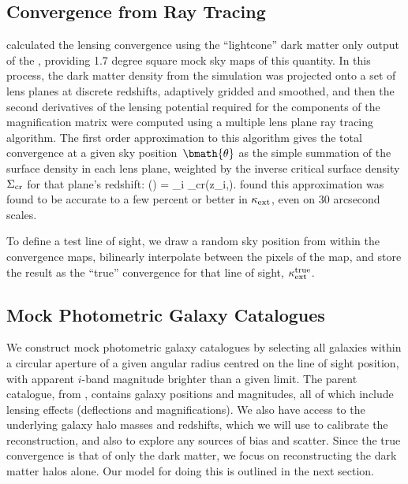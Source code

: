 \documentclass[useAMS,usenatbib]{mn2e}
\begin{document}

\subsection{Convergence from Ray Tracing}
\label{sec:MS:raytracing}

\citet{HilbertEtal2009} calculated the lensing convergence using the
``lightcone'' dark matter only 
output of the \MS, providing 1.7 degree square 
mock sky maps of this
quantity. In this process, the dark matter density from the simulation
was projected onto a set of lens planes at discrete redshifts,
adaptively gridded and smoothed, and then the second derivatives of the 
lensing potential required for the components of the magnification
matrix were computed using a multiple lens plane ray tracing algorithm.
The first order approximation to this algorithm \citep[equation 17
of][]{HilbertEtal2009} gives the total convergence at a given sky
position~$\bmath{\theta}$ as the simple summation of the surface density
in each lens plane, weighted by the inverse critical surface density
$\Sigma_{\rm cr}$ for that plane's redshift:
\be
\kappax(\bmath{\theta}) = \sum_i 
                                     {\Sigma_{\rm cr}(z_i,\zs)}.
\ee
\citet{HilbertEtal2009} found this approximation was found to be accurate to a few percent or better
in $\kappa_{\rm ext}$, even on 30 arcsecond scales.

To define a test line of sight, we draw a random sky position from
within the convergence maps, bilinearly interpolate between the pixels
of the map, and store the result as the ``true'' convergence for that
line of sight, $\kappa_{\rm ext}^{\rm true}$. 


\subsection{Mock Photometric Galaxy Catalogues}
\label{sec:MS:mocks}

We construct mock photometric galaxy catalogues by selecting all \MS
galaxies within a circular aperture of a given angular radius centred on
the line of sight position, with apparent $i$-band magnitude brighter
than a given limit. The parent catalogue, from \citet{HilbertEtal2011},
contains galaxy positions and magnitudes, all of which include lensing
effects (deflections and magnifications). We also have access to the
underlying galaxy halo masses and redshifts, which we will use to
calibrate the reconstruction, and also to explore any sources of bias
and scatter. Since the true convergence is that of only the dark matter,
we focus on reconstructing the dark matter halos alone. Our model for
doing this is outlined in the next section. 
\end{document}
